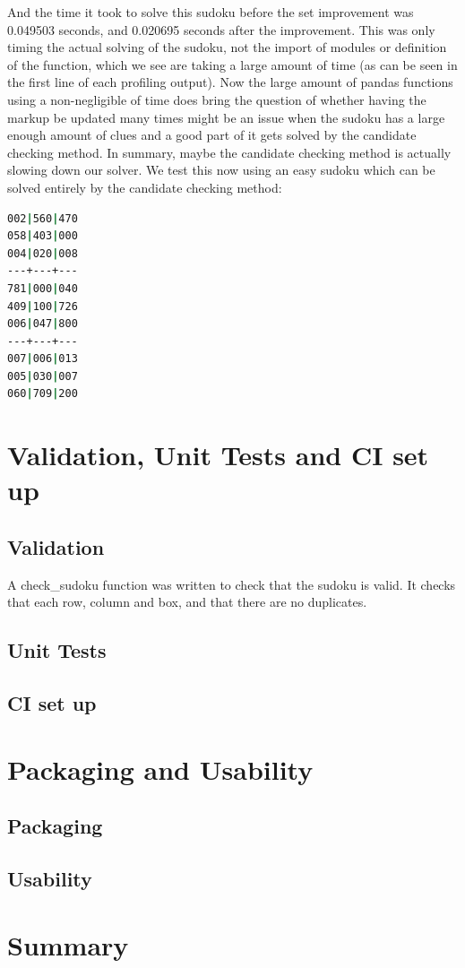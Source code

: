 \documentclass[12pt]{report} %
\begin{document}
And the time it took to solve this sudoku before the set improvement was 0.049503 seconds, and 0.020695 seconds after the improvement. This was only timing the actual solving of the sudoku, not the import of modules or definition of the function, which we see are taking a large amount of time (as can be seen in the first line of each profiling output). Now the large amount of pandas functions using a non-negligible of time does bring the question of whether having the markup be updated many times might be an issue when the sudoku has a large enough amount of clues and a good part of it gets solved by the candidate checking method. In summary, maybe the candidate checking method is actually slowing down our solver. We test this now using an easy sudoku which can be solved entirely by the candidate checking method:

\begin{lstlisting}[language=Bash, basicstyle=\tiny]
002|560|470
058|403|000
004|020|008
---+---+---
781|000|040
409|100|726
006|047|800
---+---+---
007|006|013
005|030|007
060|709|200
\end{lstlisting}


\chapter{Validation, Unit Tests and CI set up}

\section{Validation}

A check\_sudoku function was written to check that the sudoku is valid. It checks that each row, column and box, and that there are no duplicates.

\section{Unit Tests}

\section{CI set up}

\chapter{Packaging and Usability}

\section{Packaging}

\section{Usability}


\chapter{Summary}



\end{document}
